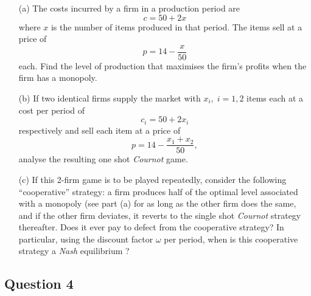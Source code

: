 \documentclass[12pt]{article}
\begin{document}
        

        \begin{enumerate}
        	\item[(a)] The costs incurred by a firm in a production period are $$ c = 50 + 2x$$ where $x$ is the number of items produced in that period. The items sell at a price of $$ p = 14- \frac{x}{50}$$ each. Find the level of production that maximises the firm's profits when the firm has a monopoly. 
        	\item[(b)]   If two identical firms supply the market with $x_i, \; i = 1,2$ items each at a cost per period of $$c_i = 50 + 2x_i$$ respectively and sell each item at a price of $$p = 14 - \frac{x_1 +x_2}{50},$$ analyse the resulting one shot \textit{Cournot} game. 
        	\item[(c)]  If this 2-firm game is to be played repeatedly, consider the following ``cooperative'' strategy: a firm produces half of the optimal level associated with a monopoly (see part (a) for as long as the other firm does the same, and if the other firm deviates, it reverts to the single shot \textit{Cournot} strategy thereafter. Does it ever pay to defect from the cooperative strategy? In particular, using the discount factor $\omega$ per period, when is this cooperative strategy a \textit{Nash} equilibrium ?  
        \end{enumerate}
        
        
        
        \newpage
		
		
		\subsection*{Question 4}
		
		
\end{document}
